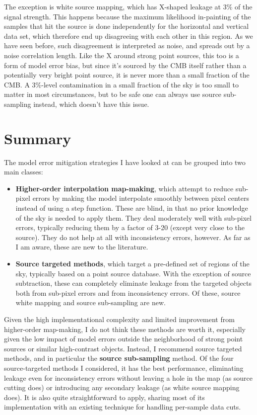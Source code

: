 \documentclass{article}
\newcommand{\dfn}[1]{\textbf{#1}}
\begin{document}
The exception is white
source mapping, which has X-shaped leakage at 3\% of the signal strength.
This happens because the
maximum likelihood in-painting of the samples that hit the source is done independently
for the horizontal and vertical data set, which therefore end up disagreeing with
each other in this region. As we have seen before, such disagreement is interpreted
as noise, and spreads out by a noise correlation length. Like the X around strong
point sources, this too is a form of model error bias, but since it's sourced by
the CMB itself rather than a potentially very bright point source, it is never
more than a small fraction of the CMB. A 3\%-level contamination in a small fraction
of the sky is too small to matter in most circumstances, but to be safe one can
always use source sub-sampling instead, which doesn't have this issue.

\section{Summary}
The model error mitigation strategies I have looked at can be grouped into two main classes:
\begin{itemize}
	\item \dfn{Higher-order interpolation map-making}, which attempt to reduce sub-pixel errors by
		making the model interpolate smoothly between pixel centers instead of using a step function.
		These are blind, in that no prior knowledge of the sky is needed to apply them. They deal
		moderately well with sub-pixel errors, typically reducing them by a factor of 3-20
		(except very close to the source). They do not help at all with inconsistency errors, however.
		As far as I am aware, these are new to the literature.
	\item \dfn{Source targeted methods}, which target a pre-defined set of regions of the sky, typically
		based on a point source database. With the exception of source subtraction, these can completely
		eliminate leakage from the targeted objects both from sub-pixel errors and from inconsistency
		errors. Of these, source white mapping and source sub-sampling are new.
\end{itemize}
Given the high implementational complexity and limited improvement from higher-order map-making,
I do not think these methods are worth it, especially given the low impact of model errors outside
the neighborhood of strong point sources or similar high-contrast objects. Instead, I recommend
source targeted methods, and in particular the \dfn{source sub-sampling} method. Of the four source-targeted
methods I considered, it has the best performance, eliminating leakage even for inconsistency errors
without leaving a hole in the map (as source cutting does) or introducing any secondary leakage
(as white source mapping does). It is also quite straightforward to apply, sharing most of its
implementation with an existing technique for handling per-sample data cuts.
\end{document}
